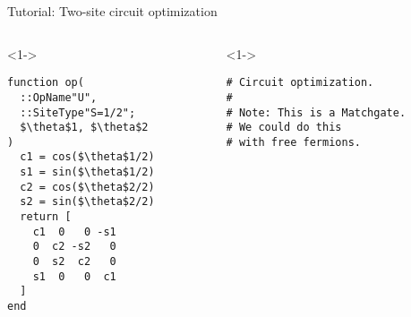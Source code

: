 \begin{frame}[fragile]{Tutorial: Two-site circuit optimization}

\begin{columns}

\begin{column}{5cm}

\begin{onlyenv}<1->

\begin{lstlisting}[language=JuliaLocal, style=julia, mathescape, basicstyle=\small]
function op(
  ::OpName"U",
  ::SiteType"S=1/2";
  $\theta$1, $\theta$2
)
  c1 = cos($\theta$1/2)
  s1 = sin($\theta$1/2)
  c2 = cos($\theta$2/2)
  s2 = sin($\theta$2/2)
  return [
    c1  0   0 -s1
    0  c2 -s2   0
    0  s2  c2   0
    s1  0   0  c1
  ]
end
\end{lstlisting}

\end{onlyenv}


\end{column}

\begin{column}{5cm}

\begin{onlyenv}<1->

\begin{lstlisting}[style=julia, numbers=none, mathescape, basicstyle=\small]
# Circuit optimization.
#
# Note: This is a Matchgate.
# We could do this
# with free fermions.










 \end{lstlisting}

\end{onlyenv}


\end{column}

\end{columns}

\end{frame}
